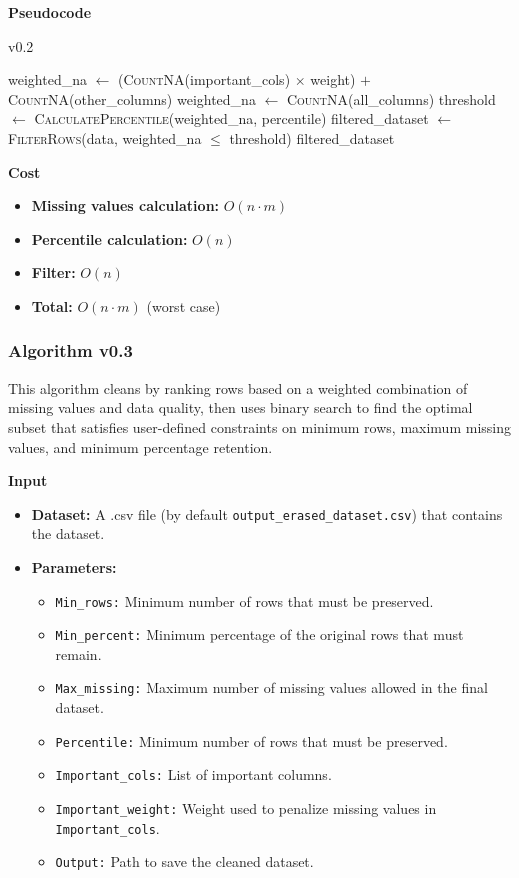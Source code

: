 \documentclass[a4paper,12pt]{article}
\begin{document}
\textbf{Pseudocode}
\begin{algorithm}[H]
\caption{v0.2}
\begin{algorithmic}[1]
            \State weighted\_na $\gets$ (\textsc{CountNA}(important\_cols) $\times$ weight) $+$ \textsc{CountNA}(other\_columns)
        \Else
            \State weighted\_na $\gets$ \textsc{CountNA}(all\_columns)
        \EndIf
    \EndFor
    \State threshold $\gets$ \textsc{CalculatePercentile}(weighted\_na, percentile)
    \State filtered\_dataset $\gets$ \textsc{FilterRows}(data, weighted\_na $\leq$ threshold)
    \State \Return filtered\_dataset
\EndFunction
\end{algorithmic}
\end{algorithm}
\textbf{Cost}
\begin{itemize}
    \item \textbf{Missing values calculation:} $O(n \cdot m)$ 
    \item \textbf{Percentile calculation:} $O(n)$
    \item \textbf{Filter:} $O(n)$
    \item \textbf{Total:} $O(n \cdot m)$ (worst case)
\end{itemize}


\subsubsection{Algorithm v0.3}
This algorithm cleans by ranking rows based on a weighted combination of missing values and data quality, then uses binary search to find the optimal subset that satisfies user-defined constraints on minimum rows, maximum missing values, and minimum percentage retention.

\textbf{Input}
\begin{itemize}
    \item \textbf{Dataset:} A .csv file (by default \texttt{output\_erased\_dataset.csv}) that contains the dataset.
    \item \textbf{Parameters:}
    \begin{itemize}
        \item \texttt{Min\_rows:} Minimum number of rows that must be preserved.
        \item \texttt{Min\_percent:} Minimum percentage of the original rows that must remain.
        \item \texttt{Max\_missing:} Maximum number of missing values allowed in the final dataset.
        \item \texttt{Percentile:} Minimum number of rows that must be preserved.
        \item \texttt{Important\_cols:} List of important columns.
        \item \texttt{Important\_weight:} Weight used to penalize missing values in \texttt{Important\_cols}.
        \item \texttt{Output:} Path to save the cleaned dataset.
    \end{itemize}
\end{itemize}
\end{document}
